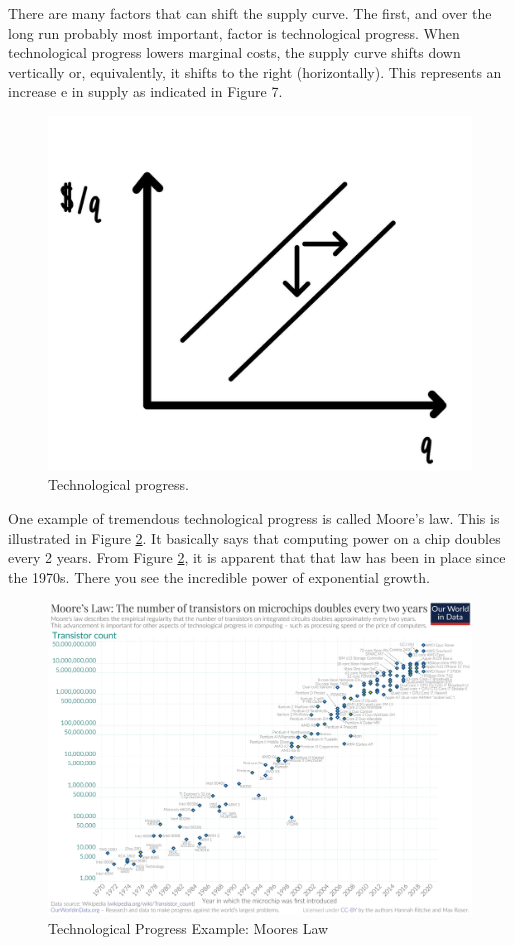 \documentclass[
]{book}
\begin{document}
There are many factors that can shift the supply curve. The first, and over the long run probably most important, factor is technological progress. When technological progress lowers marginal costs, the supply curve shifts down vertically or, equivalently, it shifts to the right (horizontally). This represents an increase e in supply as indicated in Figure 7.

\begin{figure}

{\centering \includegraphics[width=0.75\linewidth]{img/ch4/fig7} 

}

\caption{Technological progress.}\label{fig:fig407}
\end{figure}

One example of tremendous technological progress is called Moore's law. This is illustrated in Figure \ref{fig:fig408}. It basically says that computing power on a chip doubles every 2 years. From Figure \ref{fig:fig408}, it is apparent that that law has been in place since the 1970s. There you see the incredible power of exponential growth.

\begin{figure}

{\centering \includegraphics[width=0.75\linewidth]{img/ch4/fig8} 

}

\caption{Technological Progress Example: Moores Law}\label{fig:fig408}
\end{figure}
\end{document}
